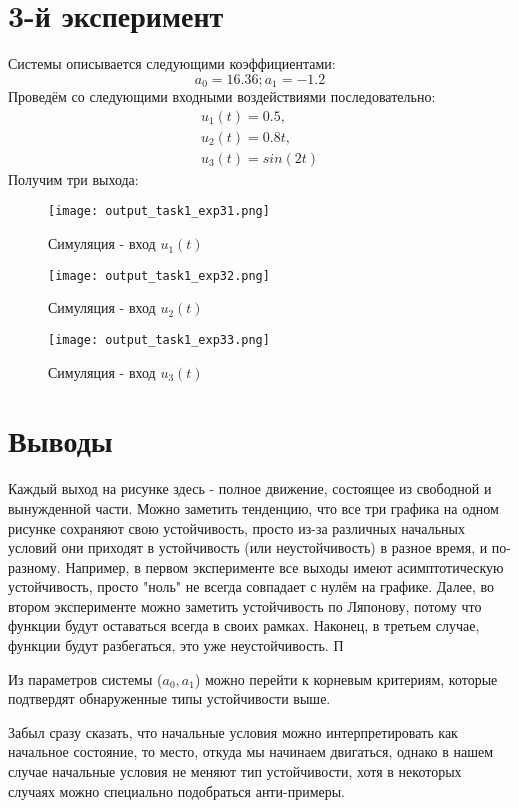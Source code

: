 \newpage
\section{3-й эксперимент}
Системы описывается следующими коэффициентами:
$$
a_0 = 16.36; a_1 = -1.2
$$
Проведём со следующими входными воздействиями последовательно:
$$
\begin{aligned}
    u_1(t) = 0.5, \\
    u_2(t) = 0.8t, \\
    u_3(t) = sin(2t) 
\end{aligned}
$$
Получим три выхода:
\begin{figure}[ht]
    \centering
    \texttt{[image: output\_task1\_exp31.png]}
  \caption{Симуляция - вход $u_1(t)$}
\end{figure}
\begin{figure}[ht]
    \centering
    \texttt{[image: output\_task1\_exp32.png]}
  \caption{Симуляция - вход $u_2(t)$}
\end{figure}
\begin{figure}[ht]
    \centering
    \texttt{[image: output\_task1\_exp33.png]}
  \caption{Симуляция - вход $u_3(t)$}
\end{figure}

\section{Выводы}

Каждый выход на рисунке здесь - полное движение, состоящее из свободной и вынужденной части.
Можно заметить тенденцию, что все три графика на одном рисунке сохраняют свою устойчивость, просто из-за различных начальных условий они приходят в устойчивость (или неустойчивость) в разное время, и по-разному. Например, в первом эксперименте все выходы имеют асимптотическую устойчивость, просто "ноль" не всегда совпадает с нулём на графике.
Далее, во втором эксперименте можно заметить устойчивость по Ляпонову, потому что функции будут оставаться всегда в своих рамках. Наконец, в третьем случае, функции будут разбегаться, это уже неустойчивость. П

Из параметров системы ($a_0, a_1$) можно перейти к корневым критериям, которые подтвердят обнаруженные типы устойчивости выше.

Забыл сразу сказать, что начальные условия можно интерпретировать как начальное состояние, то место, откуда мы начинаем двигаться, однако в нашем случае начальные условия не меняют тип устойчивости, хотя в некоторых случаях можно специально подобраться анти-примеры.

\endinput